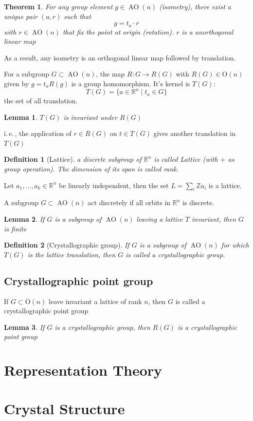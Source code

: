 \documentclass{amsart}
\newtheorem{definition}{Definition}
\newtheorem{theorem}{Theorem}
\newtheorem{lemma}{Lemma}
\DeclareMathOperator{\AO}{AO}
\begin{document}
\begin{theorem}
    For any group element $g\in \AO(n)$ (isometry), there exist a unique pair $(a,r)$ such that 
    \[g = t_a \cdot r\]
    with $r\in \AO(n)$ that fix the point at origin (rotation). $r$ is a anorthogonal linear map
\end{theorem}
As a result, any isometry is an orthogonal linear map followed by translation.

\vspace{10pt} %

For a subgroup $G\subset \AO(n)$, the map $R\colon G \to R(G)$ with $R(G)\in \text{O}(n)$ given by
$g = t_a R(g)$ is a group homomorphism. It's kernel is $T(G)$:
\begin{equation}
    T(G) = \{ a \in \mathbb{R}^n \mid t_a \in G\}
\end{equation}
the set of all translation. 

\begin{lemma}
    $T(G)$ is invariant under $R(G)$
\end{lemma}
i.\,e.\,, the application of $r\in R(G)$ on $t\in T(G)$ gives another translation in $T(G)$

\vspace{10pt} %

\begin{definition}
    [Lattice]
    a discrete subgroup of $\mathbb{R}^n$ is called Lattice (with $+$ as group operation). The dimension of its span is called rank.
\end{definition}
Let $a_1,\dots,a_k \in \mathbb{R}^n$ be linearly independent, then the set 
$L = \sum_i \mathbb{Z} a_i$ is a lattice.

A subgroup $G\subset \AO(n)$ act discretely if all orbits in $\mathbb{R}^n$ is discrete.

\begin{lemma}
    If $G$ is a subgroup of $\AO(n)$ leaving a lattice $T$ invariant, then $G$ is finite
\end{lemma}

\begin{definition}
    [Crystallographic group]
    If $G$ is a subgroup of $\AO(n)$ for which $T(G)$ is the lattice translation, then $G$ is called 
    a crystallographic group.
\end{definition}
\subsection*{Crystallographic point group}
If $G\subset \text{O}(n)$ leave invariant a lattice of rank $n$, then $G$ is called a crystallographic point group

\begin{lemma}
    If $G$ is a crystallographic group, then $R(G)$ is a crystallographic point group
\end{lemma}


\newpage
\section{Representation Theory}

\newpage
\section{Crystal Structure}
\end{document}
